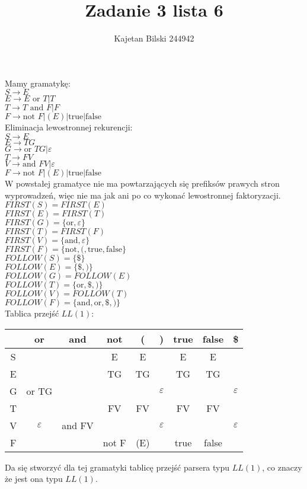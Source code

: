 \documentclass{article}
\title{Zadanie 3 lista 6}
\author{Kajetan Bilski 244942}
\begin{document}
	\maketitle

Mamy gramatykę:\\
$S \to E$\\
$E \to E \text{ or } T|T$\\
$T \to T \text{ and } F|F$\\
$F \to \text{not } F|(E)|\text{true}|\text{false}$\\
Eliminacja lewostronnej rekurencji:\\
$S \to E$\\
$E \to TG$\\
$G \to \text{or }TG|\varepsilon$\\
$T \to FV$\\
$V \to \text{and }FV|\varepsilon$\\
$F \to \text{not } F|(E)|\text{true}|\text{false}$\\
W powstałej gramatyce nie ma powtarzających się prefiksów prawych stron wyprowadzeń, więc nie ma jak ani po co wykonać lewostronnej faktoryzacji.\\
$FIRST(S) = FIRST(E)$\\
$FIRST(E) = FIRST(T)$\\
$FIRST(G) = \{ \text{or},\varepsilon\} $\\
$FIRST(T) = FIRST(F)$\\
$FIRST(V) = \{ \text{and},\varepsilon\} $\\
$FIRST(F) = \{ \text{not},( ,\text{true},\text{false}\} $\\
$FOLLOW(S) = \{ \$ \} $\\
$FOLLOW(E) = \{ \$ ,)\} $\\
$FOLLOW(G) = FOLLOW(E)$\\
$FOLLOW(T) = \{ \text{or},\$ ,) \} $\\
$FOLLOW(V) = FOLLOW(T)$\\
$FOLLOW(F) = \{ \text{and},\text{or},\$ ,) \} $\\
Tablica przejść $LL(1)$:\\
\begin{center}
	\begin{tabular} {c | c | c | c | c | c | c | c | c}
		& or & and & not & ( & ) & true & false & \$ \\ \hline
		S & & & E & E & & E & E & \\ \hline
		E & & & TG & TG & & TG & TG & \\ \hline
		G & or TG & & & & $\varepsilon$ & & & $\varepsilon$ \\ \hline
		T & & & FV & FV & & FV & FV & \\ \hline
		V & $\varepsilon$ & and FV & & & $\varepsilon$ & & & $\varepsilon$ \\ \hline
		F & & & not F & (E) & & true & false & \\
	\end{tabular}
\end{center}
Da się stworzyć dla tej gramatyki tablicę przejść parsera typu $LL(1)$, co znaczy że jest ona typu $LL(1)$.
\end{document}
